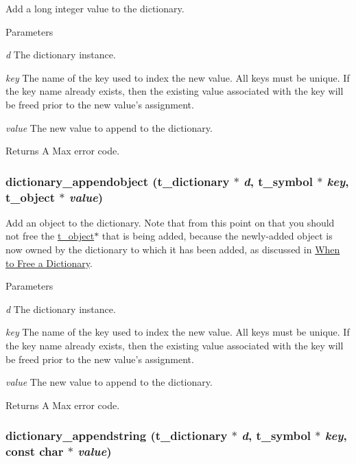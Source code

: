 Add a long integer value to the dictionary. 
\begin{DoxyParams}{Parameters}
\item[{\em d}]The dictionary instance. \item[{\em key}]The name of the key used to index the new value. All keys must be unique. If the key name already exists, then the existing value associated with the key will be freed prior to the new value's assignment. \item[{\em value}]The new value to append to the dictionary. \end{DoxyParams}
\begin{DoxyReturn}{Returns}
A Max error code. 
\end{DoxyReturn}
\hypertarget{group__dictionary_ga64e86e71b47a2d9719a43ec8bd376591}{
\subsubsection[{dictionary\_\-appendobject}]{ dictionary\_\-appendobject ({\bf t\_\-dictionary} $\ast$ {\em d}, \/  {\bf t\_\-symbol} $\ast$ {\em key}, \/  {\bf t\_\-object} $\ast$ {\em value})}}
\label{group__dictionary_ga64e86e71b47a2d9719a43ec8bd376591}


Add an object to the dictionary. Note that from this point on that you should not free the \hyperlink{structt__object}{t\_\-object}$\ast$ that is being added, because the newly-\/added object is now owned by the dictionary to which it has been added, as discussed in \hyperlink{group__dictionary_when_to_free_a_dictionary}{When to Free a Dictionary}.


\begin{DoxyParams}{Parameters}
\item[{\em d}]The dictionary instance. \item[{\em key}]The name of the key used to index the new value. All keys must be unique. If the key name already exists, then the existing value associated with the key will be freed prior to the new value's assignment. \item[{\em value}]The new value to append to the dictionary. \end{DoxyParams}
\begin{DoxyReturn}{Returns}
A Max error code. 
\end{DoxyReturn}
\hypertarget{group__dictionary_ga9b5b07cf479be0446d6a4441c3bdf83a}{
\subsubsection[{dictionary\_\-appendstring}]{ dictionary\_\-appendstring ({\bf t\_\-dictionary} $\ast$ {\em d}, \/  {\bf t\_\-symbol} $\ast$ {\em key}, \/  const char $\ast$ {\em value})}}
\label{group__dictionary_ga9b5b07cf479be0446d6a4441c3bdf83a}


